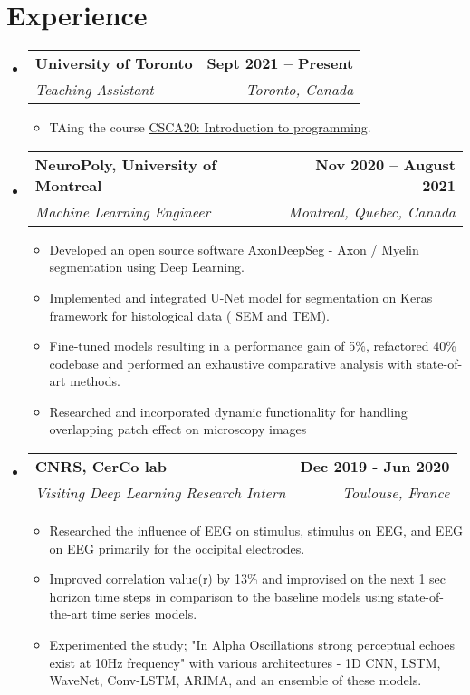 \documentclass[letterpaper,11pt]{article}
\makeatletter
\newcommand{\resumeItem}[1]{
  \item\small{
    {#1 \vspace{-2pt}}
  }
}
\newcommand{\resumeSubheading}[4]{
  \vspace{-2pt}\item
    \begin{tabular*}{1.0\textwidth}[t]{l@{\extracolsep{\fill}}r}
      \textbf{#1} & \textbf{\small #2} \\
      \textit{\small#3} & \textit{\small #4} \\
    \end{tabular*}\vspace{-7pt}
}
\newcommand{\resumeSubHeadingListStart}{\begin{itemize}[leftmargin=0.0in, label={}]}
\newcommand{\resumeSubHeadingListEnd}{\end{itemize}}
\newcommand{\resumeItemListStart}{\begin{itemize}}
\newcommand{\resumeItemListEnd}{\end{itemize}\vspace{-5pt}}
\makeatother
\begin{document}
\section{Experience}
  \resumeSubHeadingListStart

    \resumeSubheading
      {University of Toronto}{Sept 2021 -- Present}
      {Teaching Assistant}{Toronto, Canada}
      \resumeItemListStart
        \resumeItem{TAing the course \href{http://www.brianharrington.net/}{CSCA20: Introduction to programming}.}
      \resumeItemListEnd

    \resumeSubheading
      {NeuroPoly, University of Montreal}{Nov 2020 -- August 2021}
      {Machine Learning Engineer}{Montreal, Quebec, Canada}
      \resumeItemListStart
        \resumeItem {Developed an open source software     \href{https://github.com/neuropoly/axondeepseg}{AxonDeepSeg} - Axon / Myelin segmentation using Deep Learning.}
         \resumeItem {Implemented and integrated U-Net model for segmentation on Keras framework for histological data ( SEM and TEM).}
        \resumeItem {Fine-tuned models resulting in a performance gain of 5\%, refactored 40\% codebase and performed an exhaustive comparative analysis with state-of-art methods.}
        \resumeItem {Researched and incorporated dynamic functionality for handling overlapping patch effect on microscopy images}
    \resumeItemListEnd

    \resumeSubheading
    {CNRS, CerCo lab}{Dec 2019 - Jun 2020}
    {Visiting Deep Learning Research Intern}{Toulouse, France}
        \resumeItemListStart
            \resumeItem{Researched the influence of EEG on stimulus, stimulus on EEG, and EEG on EEG primarily for the occipital electrodes.}\resumeItem{Improved correlation value(r) by 13\% and improvised on the next 1 sec horizon time steps in comparison to the baseline models using state-of-the-art time series models.}
            \resumeItem{Experimented the study; "In Alpha Oscillations strong perceptual echoes exist at 10Hz frequency" with various architectures - 1D CNN, LSTM, WaveNet, Conv-LSTM, ARIMA, and an ensemble of these models.}
        \resumeItemListEnd
  \resumeSubHeadingListEnd
\vspace{-16pt}
\end{document}
